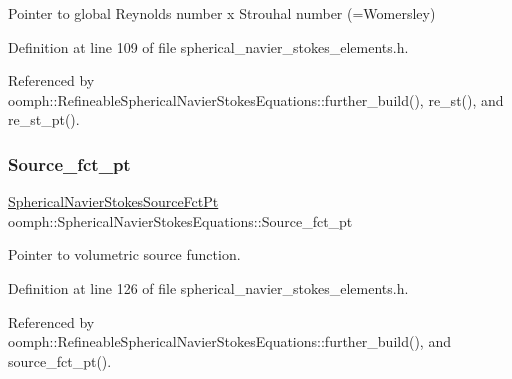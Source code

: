 Pointer to global Reynolds number x Strouhal number (=Womersley) 



Definition at line 109 of file spherical\+\_\+navier\+\_\+stokes\+\_\+elements.\+h.



Referenced by oomph\+::\+Refineable\+Spherical\+Navier\+Stokes\+Equations\+::further\+\_\+build(), re\+\_\+st(), and re\+\_\+st\+\_\+pt().

\mbox{\label{classoomph_1_1SphericalNavierStokesEquations_a0f8bbc9d353784821db5781ebedeece5}} 
\subsubsection{\texorpdfstring{Source\+\_\+fct\+\_\+pt}{Source\_fct\_pt}}
{\footnotesize\ttfamily \hyperlink{classoomph_1_1SphericalNavierStokesEquations_abd522fea532c3de15dbe80205e53bdf8}{Spherical\+Navier\+Stokes\+Source\+Fct\+Pt} oomph\+::\+Spherical\+Navier\+Stokes\+Equations\+::\+Source\+\_\+fct\+\_\+pt\hspace{0.3cm}{\ttfamily [protected]}}



Pointer to volumetric source function. 



Definition at line 126 of file spherical\+\_\+navier\+\_\+stokes\+\_\+elements.\+h.



Referenced by oomph\+::\+Refineable\+Spherical\+Navier\+Stokes\+Equations\+::further\+\_\+build(), and source\+\_\+fct\+\_\+pt().

\mbox{\label{classoomph_1_1SphericalNavierStokesEquations_a7c52a5669ff71d86186bd88149df9b33}} 
